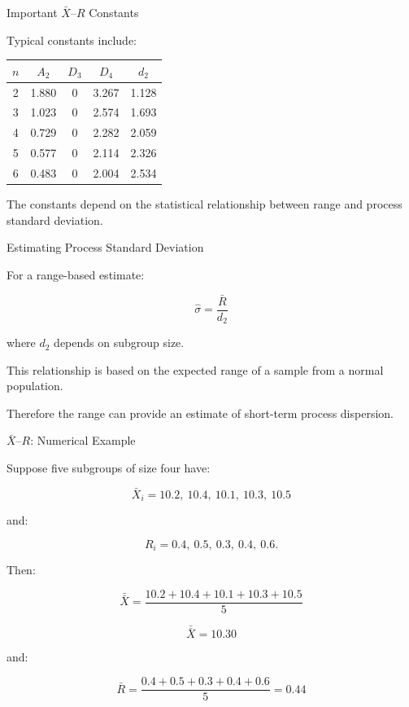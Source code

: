 \documentclass[aspectratio=169,10pt]{beamer}
\begin{document}

\begin{frame}[shrink=18]{Important $\bar X$--$R$ Constants}
\small

Typical constants include:

\begin{tabularx}{\textwidth}{CCCCC}
\toprule
\(n\) & \(A_2\) & \(D_3\) & \(D_4\) & \(d_2\)\\
 & 1.880 & 0 & 3.267 & 1.128\\
3 & 1.023 & 0 & 2.574 & 1.693\\
4 & 0.729 & 0 & 2.282 & 2.059\\
5 & 0.577 & 0 & 2.114 & 2.326\\
6 & 0.483 & 0 & 2.004 & 2.534\\
\bottomrule
\end{tabularx}

The constants depend on the statistical relationship between
range and process standard deviation.

\end{frame}


\begin{frame}[shrink=18]{Estimating Process Standard Deviation}
\small

For a range-based estimate:

\[
\boxed{
\hat\sigma=
\frac{\bar R}{d_2}
}
\]

where \(d_2\) depends on subgroup size.

This relationship is based on the expected range of a sample
from a normal population.

Therefore the range can provide an estimate of short-term
process dispersion.

\end{frame}


\begin{frame}[shrink=18]{$\bar X$--$R$: Numerical Example}
\small

Suppose five subgroups of size four have:

\[
\bar X_i=
10.2,\ 10.4,\ 10.1,\ 10.3,\ 10.5
\]

and:

\[
R_i=
0.4,\ 0.5,\ 0.3,\ 0.4,\ 0.6.
\]

Then:

\[
\bar{\bar X}
=
\frac{10.2+10.4+10.1+10.3+10.5}{5}
\]

\[
\boxed{
\bar{\bar X}=10.30
}
\]

and:

\[
\boxed{
\bar R=\frac{0.4+0.5+0.3+0.4+0.6}{5}=0.44
}
\]

\end{frame}
\end{document}
